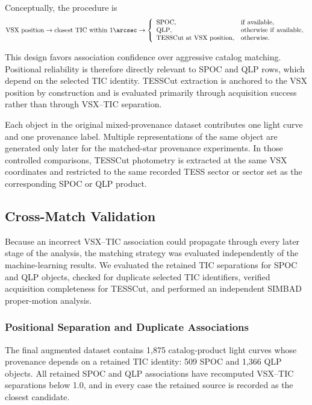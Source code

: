 \documentclass[linenumbers]{aastex701}
\begin{document}
Conceptually, the procedure is
\begin{equation}
\mathrm{VSX\ position}
\rightarrow
\mathrm{closest\ TIC\ within\ }1\arcsec
\rightarrow
\left\{
\begin{array}{ll}
\mathrm{SPOC}, & \mathrm{if\ available},\\
\mathrm{QLP}, & \mathrm{otherwise\ if\ available},\\
\mathrm{TESSCut\ at\ VSX\ position}, & \mathrm{otherwise}.
\end{array}
\right.
\end{equation}

This design favors association confidence over aggressive catalog matching. Positional reliability is therefore directly relevant to SPOC and QLP rows, which depend on the selected TIC identity. TESSCut extraction is anchored to the VSX position by construction and is evaluated primarily through acquisition success rather than through VSX--TIC separation.

Each object in the original mixed-provenance dataset contributes one light curve and one provenance label. Multiple representations of the same object are generated only later for the matched-star provenance experiments. In those controlled comparisons, TESSCut photometry is extracted at the same VSX coordinates and restricted to the same recorded TESS sector or sector set as the corresponding SPOC or QLP product.


\subsection{Cross-Match Validation}
\label{subsec:match_validation}

Because an incorrect VSX--TIC association could propagate through every later stage of the analysis, the matching strategy was evaluated independently of the machine-learning results. We evaluated the retained TIC separations for SPOC and QLP objects, checked for duplicate selected TIC identifiers, verified acquisition completeness for TESSCut, and performed an independent SIMBAD proper-motion analysis.

\subsubsection{Positional Separation and Duplicate Associations}
\label{subsubsec:positional_validation}

The final augmented dataset contains 1,875 catalog-product light curves whose provenance depends on a retained TIC identity: 509 SPOC and 1,366 QLP objects. All retained SPOC and QLP associations have recomputed VSX--TIC separations below 1.0\arcsec, and in every case the retained source is recorded as the closest candidate.
\end{document}
